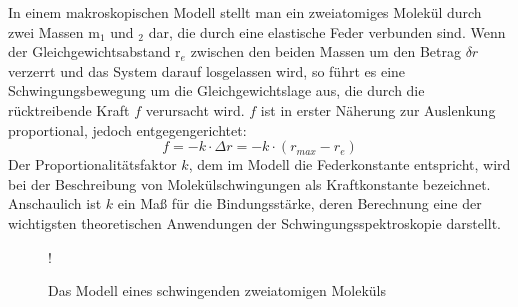 \documentclass[12pt]{article}
\begin{document}
In einem makroskopischen Modell stellt man ein zweiatomiges Molekül
durch zwei Massen m$_1$ und $_2$ dar, die durch eine elastische Feder verbunden sind.
Wenn der Gleichgewichtsabstand r$_e$ zwischen den beiden Massen um den Betrag $\delta r$
verzerrt und das System darauf losgelassen wird, so führt es eine Schwingungsbewegung
um die Gleichgewichtslage aus, die durch die rücktreibende Kraft $f$ verursacht wird. $f$
ist in erster Näherung zur Auslenkung proportional, jedoch entgegengerichtet:
\begin{equation}
f = - k \cdot \Delta r = -k \cdot (r_{max} -r_e)
\end{equation}
Der Proportionalitätsfaktor $k$, dem im Modell die Federkonstante entspricht,
wird bei der Beschreibung von Molekülschwingungen als Kraftkonstante bezeichnet.
Anschaulich ist $k$ ein Maß für die Bindungsstärke, deren Berechnung eine der wichtigsten
theoretischen Anwendungen der Schwingungsspektroskopie darstellt.
\begin{figure}
\centering
\resizebox {.6\linewidth} {!} {
}
\caption{Das Modell eines schwingenden zweiatomigen Moleküls} \label{fig:M1}
\end{figure}
\end{document}
